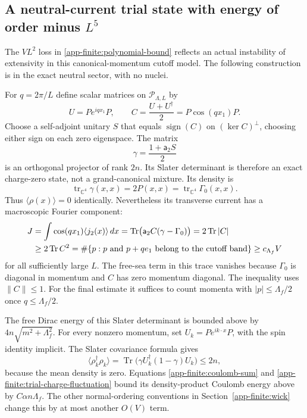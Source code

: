 \subsection{A neutral-current trial state with energy of order minus \texorpdfstring{$L^5$}{L to the fifth power}}
\label{app-finite:current-counterexample}

The $VL^2$ loss in \eqref{app-finite:polynomial-bound} reflects an actual
instability of extensivity in this canonical-momentum cutoff model.  The
following construction is in the exact neutral sector, with no nuclei.

For $q=2\pi/L$ define scalar matrices on $\mathcal P_{\Lambda,L}$ by
\[
 U=P e^{iqx_1}P,
 \qquad C=\frac{U+U^\dagger}{2}=P\cos(qx_1)P.
\]
Choose a self-adjoint unitary $S$ that equals $\operatorname{sign}(C)$ on
$(\ker C)^\perp$, choosing either sign on each zero eigenspace.  The matrix
\begin{equation}
 \gamma=\frac{1+\mathsf a_2S}{2}
 \label{app-finite:trial-projector}
\end{equation}
is an orthogonal projector of rank $2n$.  Its Slater determinant is therefore
an exact charge-zero state, not a grand-canonical mixture.  Its density is
\[
 \operatorname{tr}_{\mathbb C^4}\gamma(x,x)
 =2P(x,x)
 =\operatorname{tr}_{\mathbb C^4}\Gamma_0(x,x).
\]
Thus $\langle\rho(x)\rangle=0$ identically.  Nevertheless its transverse
current has a macroscopic Fourier component:
\begin{align}
 J&=\int\cos(qx_1)\langle j_2(x)\rangle\,dx
   =\operatorname{Tr}\bigl(\mathsf a_2C(\gamma-\Gamma_0)\bigr)
   =2\operatorname{Tr}|C|\nonumber\\
  &\ge2\operatorname{Tr}C^2
   =\#\{p:p\hbox{ and }p+qe_1\hbox{ belong to the cutoff band}\}
   \ge c_{\Lambda_f}V
 \label{app-finite:macroscopic-current}
\end{align}
for all sufficiently large $L$.  The free-sea term in this trace vanishes
because $\Gamma_0$ is diagonal in momentum and $C$ has zero momentum diagonal.
The inequality uses $\|C\|\le1$.  For the final estimate it suffices to count
momenta with $|p|\le\Lambda_f/2$ once $q\le\Lambda_f/2$.

The free Dirac energy of this Slater determinant is bounded above by
$4n\sqrt{m^2+\Lambda_f^2}$.  For every nonzero momentum, set
$U_k=P e^{ik\cdot x}P$, with the spin identity implicit.  The Slater covariance
formula gives
\begin{equation}
 \langle\rho_k^\dagger\rho_k\rangle
 =\operatorname{Tr}\bigl(\gamma U_k^\dagger(1-\gamma)U_k\bigr)
 \le2n,
 \label{app-finite:trial-charge-fluctuation}
\end{equation}
because the mean density is zero.  Equations
\eqref{app-finite:coulomb-sum} and
\eqref{app-finite:trial-charge-fluctuation} bound its density-product Coulomb
energy above by $C\alpha n\Lambda_f$.  The other normal-ordering conventions
in Section~\ref{app-finite:wick} change this by at most another $O(V)$ term.

